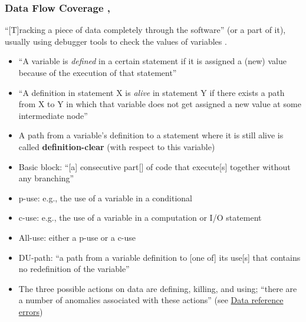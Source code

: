 \subsubsection[Data Flow Coverage]{Data Flow Coverage \citep[p.~114]{Patton2006},
    \citep[pp.~424-425]{vanVliet2000}}
\label{data-flow-coverage}

``[T]racking a piece of data completely through the software'' (or a part of
it), usually using debugger tools to check the values of variables
\citep[p.~114]{Patton2006}.

\begin{itemize}
    \item ``A variable is \emph{defined} in a certain statement if it is
          assigned a (new) value because of the execution of that
          statement'' \citep[p.~424]{vanVliet2000}
    \item ``A definition in statement X is \emph{alive} in statement Y if
          there exists a path from X to Y in which that variable does not
          get assigned a new value at some intermediate node''
          \citep[p.~424]{vanVliet2000}
    \item A path from a variable's definition to a statement where it is
          still alive is called \textbf{definition-clear} (with respect to
          this variable) \citep[p.~424]{vanVliet2000}
    \item Basic block: ``[a] consecutive part[] of code that execute[s]
          together without any branching'' \citep[p.~477]{PetersAndPedrycz2000}
    \item \acf{p-use}: e.g., the use of a variable in a conditional
          \citep[p.~424]{vanVliet2000}
    \item \acf{c-use}: e.g., the use of a variable in a computation or I/O
          statement \citep[p.~424]{vanVliet2000}
    \item All-use: either a \acs{p-use} or a \acs{c-use}~
          \citep[p.~478]{PetersAndPedrycz2000}
    \item DU-path: ``a path from a variable definition to [one of] its use[s]
          that contains no redefinition of the variable''
          \citep[pp.~478-479]{PetersAndPedrycz2000}
    \item The three possible actions on data are defining, killing, and using;
          ``there are a number of anomalies associated with these actions''
          \citep[pp.~478,~480]{PetersAndPedrycz2000}
          (see \hyperref[data-ref-errors]{Data reference errors})
\end{itemize}

